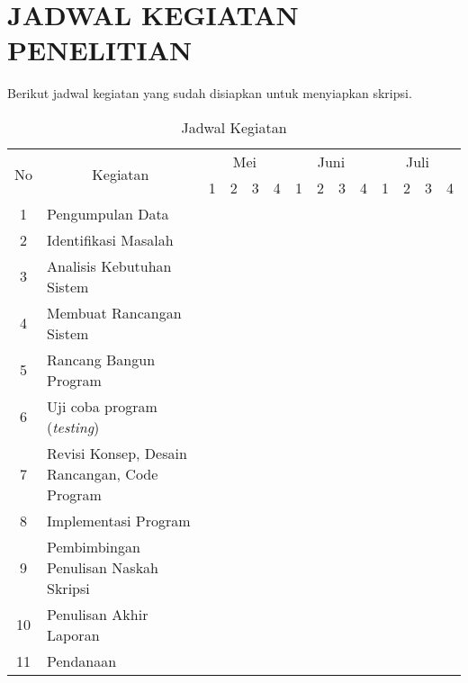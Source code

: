 \chapter*{JADWAL KEGIATAN PENELITIAN}
Berikut jadwal kegiatan yang sudah disiapkan untuk menyiapkan skripsi.


\begin{table}[!ht]
\caption{Jadwal Kegiatan}
\label{tab:jadwal-kegiatan}
\begin{tabular}{|c|m{5cm}|p{.2cm}|p{.2cm}|p{.2cm}|p{.2cm}|p{.2cm}|p{.2cm}|p{.2cm}|p{.2cm}|p{.2cm}|p{.2cm}|p{.2cm}|p{.2cm}|}
\hline
\multirow{2}{*}{No}	& 
\multicolumn{1}{c|}{\multirow{2}{*}{Kegiatan}}	& 
\multicolumn{4}{c|}{Mei} & 
\multicolumn{4}{c|}{Juni} &
\multicolumn{4}{c|}{Juli} \\ \cline{3-14}
& & 
\multicolumn{1}{c|}{1} &
\multicolumn{1}{c|}{2} &
\multicolumn{1}{c|}{3} &
\multicolumn{1}{c|}{4} &
\multicolumn{1}{c|}{1} &
\multicolumn{1}{c|}{2} &
\multicolumn{1}{c|}{3} &
\multicolumn{1}{c|}{4} &
\multicolumn{1}{c|}{1} &
\multicolumn{1}{c|}{2} &
\multicolumn{1}{c|}{3} &
\multicolumn{1}{c|}{4} \\ \hline
1  & Pengumpulan Data 			& \cellcolor{gray!75} & \cellcolor{gray!75} & & & & & & & & & & \\ \hline
2  & Identifikasi Masalah 		& & & \cellcolor{gray!75} & & & & & & & & & \\ \hline
3  & Analisis Kebutuhan Sistem 	& & \cellcolor{gray!75} & \cellcolor{gray!75} & \cellcolor{gray!75} & & & & & & & & \\ \hline
4  & Membuat Rancangan Sistem 	& & & & \cellcolor{gray!75} & \cellcolor{gray!75} & & & & & & & \\ \hline
5  & Rancang Bangun Program 	& & & & & & \cellcolor{gray!75} & \cellcolor{gray!75} & \cellcolor{gray!75} & & & & \\ \hline
6  & Uji coba program (\textit{testing}) 			& & & & & & & & \cellcolor{gray!75} & \cellcolor{gray!75} & & & \\ \hline
7  & Revisi Konsep, Desain Rancangan, Code Program & & & & & & & & & \cellcolor{gray!75} & \cellcolor{gray!75} & & \\ \hline
8  & Implementasi Program 					& & & & & & & & & & & \cellcolor{gray!75} & \\ \hline
9  & Pembimbingan Penulisan Naskah Skripsi & & & & & \cellcolor{gray!75} & \cellcolor{gray!75} & \cellcolor{gray!75} & \cellcolor{gray!75} & \cellcolor{gray!75} & & & \\ \hline
10 & Penulisan Akhir Laporan 				& & & & & & & & & & \cellcolor{gray!75} & & \\ \hline
11 & Pendanaan							& & & & & & & & & & & & \cellcolor{gray!75} \\ \hline
\end{tabular}
\end{table}

